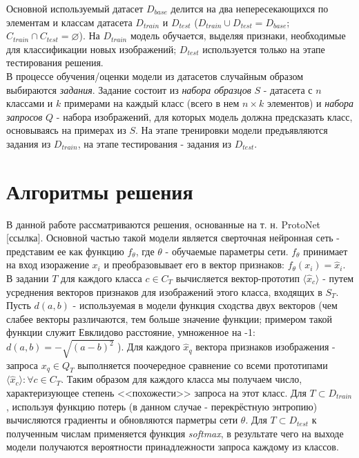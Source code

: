 \documentclass[a4paper, 12pt]{report}
\begin{document}
Основной используемый датасет $D_{base}$ делится на два непересекающихся по элементам и классам датасета $D_{train}$ и $D_{test}$ ($D_{train} \cup D_{test} = D_{base}$; $ C_{train} \cap C_{test} = \varnothing $). На $D_{train}$ модель обучается, выделяя признаки, необходимые для классификации новых изображений; $D_{test}$ используется только на этапе тестирования решения. \\

В процессе обучения/оценки модели из датасетов случайным образом выбираются \textit{задания}. Задание состоит из \textit{набора образцов} $S$ - датасета с $n$ классами и $k$ примерами на каждый класс (всего в нем $n \times k$ элементов) и \textit{набора запросов} $Q$ - набора изображений, для которых модель должна предсказать класс, основываясь на примерах из $S$. На этапе тренировки модели предъявляются задания из $D_{train}$, на этапе тестирования - задания из $D_{test}$.

\section {Алгоритмы решения}


В данной работе рассматриваются решения, основанные на т. н. ProtoNet [ссылка]. Основной частью такой модели является сверточная нейронная сеть - представим ее как функцию $f_{\theta}$, где $\theta$ - обучаемые параметры сети. $f_{\theta}$ принимает на вход изоражение $x_i$ и преобразовывает его в вектор признаков: $f_{\theta}(x_i) = \hat{x}_i$. В задании $T$ для каждого класса $c \in C_T$ вычисляется вектор-прототип $\langle  \hat{x}_c \rangle$ - путем усреднения векторов признаков для изображений этого класса, входящих в $S_T$. Пусть $d(a, b)$ - используемая в модели функция сходства двух векторов (чем слабее векторы различаются, тем больше значение функции; примером такой функции служит Евклидово расстояние, умноженное на -1: $d(a, b) = -\sqrt{{(a - b)}^2}$ ). Для каждого $ \hat{x}_q  $ вектора признаков изображения - запроса $x_q \in Q_T$ выполняется поочередное сравнение со всеми прототипами $\langle \hat{x}_c \rangle : \forall c \in C_T$. Таким образом для каждого класса мы получаем число, характеризующее степень <<похожести>> запроса на этот класс. Для $T \subset D_{train}$, используя функцию потерь (в данном случае - перекрёстную энтропию) вычисляются градиенты и обновляются парметры сети $\theta$. Для $T \subset D_{test}$ к полученным числам применяется функция \textit{softmax}, в результате чего на выходе модели получаются вероятности принадлежности запроса каждому из классов. \\
\end{document}
